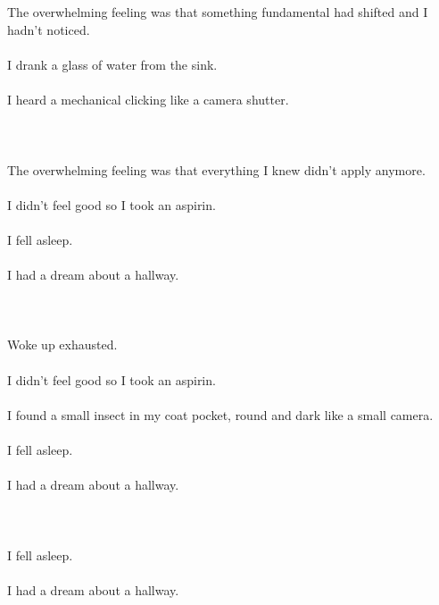 \documentclass{article}
\begin{document}
    \section{}
    The overwhelming feeling was that something fundamental had shifted and I hadn't noticed.\\\\I drank a glass of water from the sink.\\\\I heard a mechanical clicking like a camera shutter.\\\\ 
    \newpage
    
    \section{}
    The overwhelming feeling was that everything I knew didn't apply anymore.\\\\I didn't feel good so I took an aspirin.\\\\I fell asleep.\\\\I had a dream about a hallway.\\\\ 
    \newpage
    
    \section{}
    Woke up exhausted.\\\\I didn't feel good so I took an aspirin.\\\\I found a small insect in my coat pocket, round and dark like a small camera.\\\\I fell asleep.\\\\I had a dream about a hallway.\\\\ 
    \newpage
    
    \section{}
    I fell asleep.\\\\I had a dream about a hallway.\\\\ 
    \newpage
    
\end{document}
